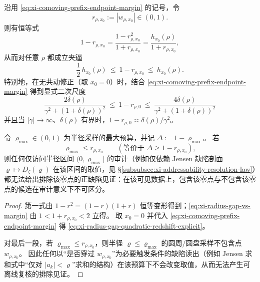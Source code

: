 \begin{proposition}\label{prop:xi-radius-budget-blind-zone-quadratic-redshift}
沿用 \eqref{eq:xi-comoving-prefix-endpoint-margin} 的记号，令
\[
r_{\rho,x_0}:=|w_{\rho,x_0}|\in(0,1).
\]
则有恒等式
\[
1-r_{\rho,x_0}
=\frac{1-r_{\rho,x_0}^2}{1+r_{\rho,x_0}}
=\frac{h_{x_0}(\rho)}{1+r_{\rho,x_0}},
\]
从而对任意 \(\rho\) 都成立夹逼
\begin{equation}\label{eq:xi-radius-gap-vs-margin}
\boxed{\;
\frac12\,h_{x_0}(\rho)\ \le\ 1-r_{\rho,x_0}\ \le\ h_{x_0}(\rho).\;}
\end{equation}
特别地，在无共动修正（取 \(x_0=0\)）时，结合 \eqref{eq:xi-comoving-prefix-endpoint-margin} 得到显式二次尺度
\begin{equation}\label{eq:xi-radius-gap-quadratic-redshift-explicit}
\boxed{\;
\frac{2\delta(\rho)}{\gamma^2+(1+\delta(\rho))^2}
\ \le\ 1-r_{\rho,0}\ \le\
\frac{4\delta(\rho)}{\gamma^2+(1+\delta(\rho))^2}\;}
\end{equation}
并且当 \(|\gamma|\to\infty\)、\(\delta(\rho)\) 有界时，\(1-r_{\rho,0}\asymp \delta(\rho)/\gamma^2\)。
\par
令 \(\varrho_{\max}\in(0,1)\) 为半径采样的最大预算，并记 \(\Delta:=1-\varrho_{\max}\)。
若
\[
\varrho_{\max}\le r_{\rho,x_0}\qquad(\text{等价于 }\Delta\ge 1-r_{\rho,x_0}),
\]
则任何仅访问半径区间 \((0,\varrho_{\max}]\) 的审计（例如仅依赖 Jensen 缺陷剖面 \(\varrho\mapsto D_\zeta(\varrho)\) 在该区间的取值，见 \S\ref{subsubsec:xi-addressability-resolution-law}）都无法给出排除该零点的正缺陷见证：在该可见数据上，包含该零点与不包含该零点的候选在审计意义下不可区分。
\end{proposition}
\begin{proof}
第一式由 \(1-r^2=(1-r)(1+r)\) 恒等变形得到；\eqref{eq:xi-radius-gap-vs-margin} 由 \(1<1+r_{\rho,x_0}<2\) 立得。
取 \(x_0=0\) 并代入 \eqref{eq:xi-comoving-prefix-endpoint-margin} 得 \eqref{eq:xi-radius-gap-quadratic-redshift-explicit}。
\par
对最后一段，若 \(\varrho_{\max}\le r_{\rho,x_0}\)，则半径 \(\varrho\le\varrho_{\max}\) 的圆周/圆盘采样不包含点 \(w_{\rho,x_0}\)。
因此任何以“是否穿过 \(w_{\rho,x_0}\)”为必要触发条件的缺陷读出（例如 Jensen 求和式中“仅对 \(|a_k|<\varrho\)”求和的结构）在该预算下不会改变取值，从而无法产生可离线复核的排除见证。
\end{proof}

